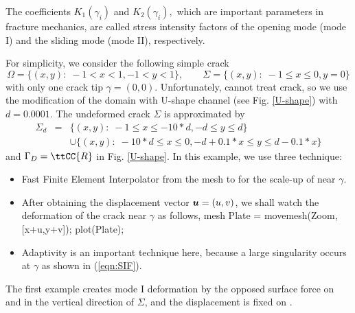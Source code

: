 \documentclass[a4paper,twoside,12pt]{book}
\def\vec#1{\mbox{\boldmath $#1$}}
\begin{document}
The coefficients $K_1(\gamma_i)$ and $K_2(\gamma_i),$ which are important parameters in fracture mechanics,
are called stress intensity factors of the opening mode (mode I)
and the sliding mode (mode II), respectively.

For simplicity, we consider the following simple crack
\[
\Omega=\{(x,y):\; -1<x<1, -1<y<1\},\qquad
\Sigma=\{(x,y):\; -1\le x\le 0, y=0\}
\]
with only one crack tip $\gamma=(0,0)$.
Unfortunately, \freefempp cannot treat crack, so we use the modification
of the domain with U-shape channel (see Fig. \ref{U-shape})
with $d=0.0001$. The undeformed crack $\Sigma$ is approximated by
\begin{eqnarray*}
\Sigma_d&=&\{(x,y):\; -1\le x\le -10*d, -d\le y\le d\}\\
&&\cup\{(x,y):\; -10*d\le x\le 0, -d+0.1*x\le y\le d-0.1*x\}
\end{eqnarray*}
and $\Gamma_D=\ttCC{R}$ in Fig. \ref{U-shape}.
In this example, we use three technique:
\begin{itemize}
\item
Fast Finite Element Interpolator from the mesh 
to  for the scale-up of
near $\gamma$.
\item
After obtaining the displacement vector $\vec u=(u,v)$, we shall watch
the deformation of the crack near $\gamma$ as follows,
\bFF
mesh Plate = movemesh(Zoom,[x+u,y+v]);
plot(Plate);
\eFF
\item
Adaptivity is an important technique here, because a large singularity occurs at
$\gamma$
as shown in (\ref{eqn:SIF}).
\end{itemize}
The first example creates mode I deformation by the opposed surface force
on  and 
in the vertical direction of $\Sigma$, and
the displacement is fixed on .
\end{document}
